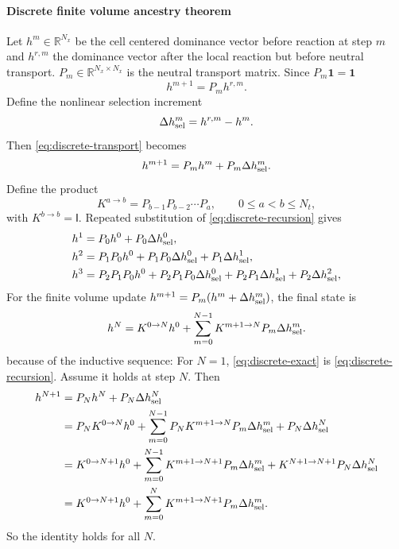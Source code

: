 \documentclass[11pt,a4paper]{report}
\newcommand{\R}{\mathbb R}
\newcommand{\one}{\mathbf 1}
\newcommand{\Id}{\mathsf I}
\begin{document}
	\paragraph{Discrete finite volume ancestry theorem}
Let \(h^m\in\R^{N_x}\) be the cell centered dominance vector before reaction at step \(m\)
and \(h^{r,m}\) the dominance vector after the local reaction but before neutral transport.
\(P_m\in\R^{N_x\times N_x}\) is the neutral transport matrix. Since \(P_m\one=\one\)
	\begin{equation}
		h^{m+1}=P_m h^{r,m}.
		\label{eq:discrete-transport}
	\end{equation}
	Define the nonlinear selection increment
	\begin{equation}
		\Delta h_{\rm sel}^m=h^{r,m}-h^m.
		\label{eq:delta-h-sel}
	\end{equation}
	Then \cref{eq:discrete-transport} becomes
	\begin{equation}
		h^{m+1}=P_mh^m+P_m\Delta h_{\rm sel}^m.
		\label{eq:discrete-recursion}
	\end{equation}
	Define the product
	\begin{equation}
		K^{a\to b}=P_{b-1}P_{b-2}\cdots P_a,
		\qquad 0\leq a<b\leq N_t,
		\label{eq:K-product}
	\end{equation}
	with \(K^{b\to b}=\Id\). Repeated substitution of \cref{eq:discrete-recursion} gives
	\begin{align}
		h^1 &=P_0h^0+P_0\Delta h_{\rm sel}^0,\nonumber\\
		h^2 &=P_1P_0h^0+P_1P_0\Delta h_{\rm sel}^0+P_1\Delta h_{\rm sel}^1,\nonumber\\
		h^3 &=P_2P_1P_0h^0+P_2P_1P_0\Delta h_{\rm sel}^0+P_2P_1\Delta h_{\rm sel}^1+P_2\Delta h_{\rm sel}^2,
	\end{align}
		For the finite volume update \(h^{m+1}=P_m(h^m+\Delta h_{\rm sel}^m)\), the final state is
		\begin{equation}
			{
				h^N=K^{0\to N}h^0+
				\sum_{m=0}^{N-1}K^{m+1\to N}P_m\Delta h_{\rm sel}^m.
			}
			\label{eq:discrete-exact}
		\end{equation}
	because of the inductive sequence: For \(N=1\), \cref{eq:discrete-exact} is \cref{eq:discrete-recursion}. Assume it holds at step \(N\). Then
		\begin{align}
			h^{N+1}
			&=P_Nh^N+P_N\Delta h_{\rm sel}^N\nonumber\\
			&=P_NK^{0\to N}h^0+
			\sum_{m=0}^{N-1}P_NK^{m+1\to N}P_m\Delta h_{\rm sel}^m
			+P_N\Delta h_{\rm sel}^N\nonumber\\
			&=K^{0\to N+1}h^0+
			\sum_{m=0}^{N-1}K^{m+1\to N+1}P_m\Delta h_{\rm sel}^m
			+K^{N+1\to N+1}P_N\Delta h_{\rm sel}^N\nonumber\\
			&=K^{0\to N+1}h^0+
			\sum_{m=0}^{N}K^{m+1\to N+1}P_m\Delta h_{\rm sel}^m.
		\end{align}
		So the identity holds for all \(N\).\\
		\\
\end{document}
